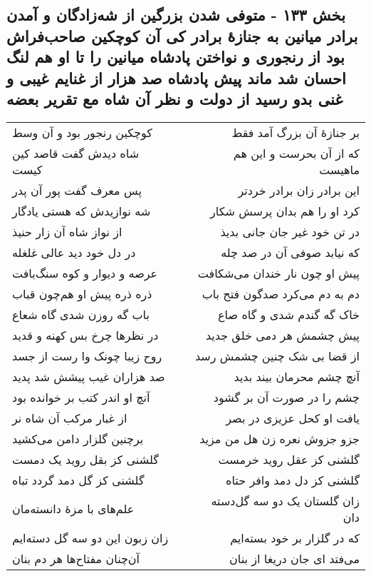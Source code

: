 \begin{center}
\section*{بخش ۱۳۳ - متوفی شدن بزرگین از شه‌زادگان و آمدن برادر میانین به جنازهٔ برادر کی آن کوچکین صاحب‌فراش بود از رنجوری و نواختن پادشاه میانین را تا او هم لنگ احسان شد ماند پیش پادشاه صد هزار از غنایم غیبی و غنی بدو رسید از دولت و نظر آن شاه مع تقریر بعضه}
\label{sec:sh133}
\begin{longtable}{l p{0.5cm} r}
کوچکین رنجور بود و آن وسط
&&
بر جنازهٔ آن بزرگ آمد فقط
\\
شاه دیدش گفت قاصد کین کیست
&&
که از آن بحرست و این هم ماهیست
\\
پس معرف گفت پور آن پدر
&&
این برادر زان برادر خردتر
\\
شه نوازیدش که هستی یادگار
&&
کرد او را هم بدان پرسش شکار
\\
از نواز شاه آن زار حنیذ
&&
در تن خود غیر جان جانی بدیذ
\\
در دل خود دید عالی غلغله
&&
که نیابد صوفی آن در صد چله
\\
عرصه و دیوار و کوه سنگ‌بافت
&&
پیش او چون نار خندان می‌شکافت
\\
ذره ذره پیش او هم‌چون قباب
&&
دم به دم می‌کرد صدگون فتح باب
\\
باب گه روزن شدی گاه شعاع
&&
خاک گه گندم شدی و گاه صاع
\\
در نظرها چرخ بس کهنه و قدید
&&
پیش چشمش هر دمی خلق جدید
\\
روح زیبا چونک وا رست از جسد
&&
از قضا بی شک چنین چشمش رسد
\\
صد هزاران غیب پیشش شد پدید
&&
آنچ چشم محرمان بیند بدید
\\
آنچ او اندر کتب بر خوانده بود
&&
چشم را در صورت آن بر گشود
\\
از غبار مرکب آن شاه نر
&&
یافت او کحل عزیزی در بصر
\\
برچنین گلزار دامن می‌کشید
&&
جزو جزوش نعره زن هل من مزید
\\
گلشنی کز بقل روید یک دمست
&&
گلشنی کز عقل روید خرمست
\\
گلشنی کز گل دمد گردد تباه
&&
گلشنی کز دل دمد وافر حتاه
\\
علم‌های با مزهٔ دانسته‌مان
&&
زان گلستان یک دو سه گل‌دسته دان
\\
زان زبون این دو سه گل دسته‌ایم
&&
که در گلزار بر خود بسته‌ایم
\\
آن‌چنان مفتاح‌ها هر دم بنان
&&
می‌فتد ای جان دریغا از بنان
\\

\end{longtable}
\end{center}
